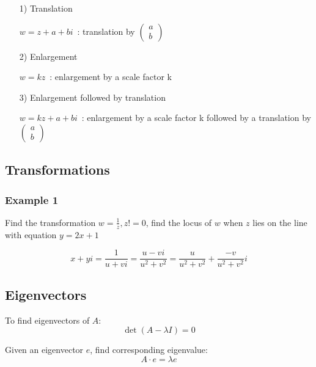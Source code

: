 \documentclass[a4paper,9pt]{scrartcl}
\begin{document}
    \begin{itemize}
        \item [1)] Translation

        $w=z+a+bi$\ : translation by
        $\begin{pmatrix}
             a \\b
        \end{pmatrix}$

        \item [2)] Enlargement

        $w=kz$\ : enlargement by a scale factor k

        \item [3)] Enlargement followed by translation

        $w=kz+a+bi$\ : enlargement by a scale factor k followed by a translation by
        $\begin{pmatrix}
             a \\b
        \end{pmatrix}$
    \end{itemize}

    \subsection{Transformations}

    \subsubsection{Example 1}
    Find the transformation $w = \frac{1}{z}, z != 0$, find the locus of $w$ when $z$ lies on the line with equation $y = 2x + 1$

    \begin{displaymath}
        x + yi = \frac{1}{u + vi} = \frac{u - vi}{u^2 + v^2} = \frac{u}{u^2+v^2} + \frac{-v}{u^2+v^2}i
    \end{displaymath}

    \subsection{Eigenvectors}
    To find eigenvectors of $A$:
    \begin{displaymath}
        \det(A-{\lambda}I) = 0
    \end{displaymath}

    Given an eigenvector $e$, find corresponding eigenvalue:
    \begin{displaymath}
        A{\cdot}e = {\lambda}e
    \end{displaymath}
\end{document}
